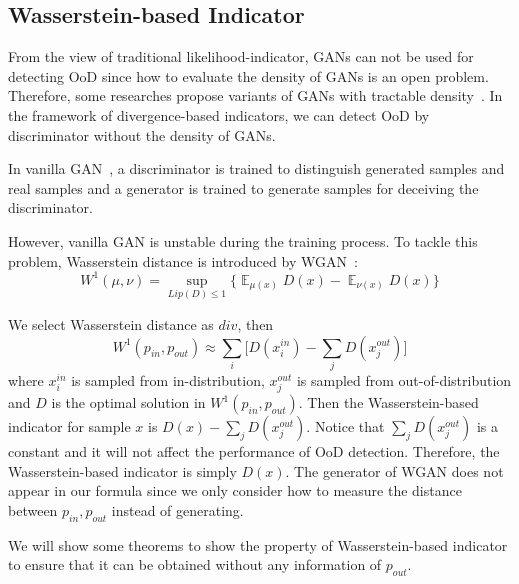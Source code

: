 \documentclass[letterpaper]{article} %
\newcommand{\E}{\operatorname{\mathbb{E}}}
\newcommand{\pin}{p_{in}}
\newcommand{\pout}{p_{out}}
\begin{document}
\subsection{Wasserstein-based Indicator}
From the view of traditional likelihood-indicator, GANs can not be used for detecting OoD since  how to evaluate the density of GANs is an open problem\cite{nalisnick2019do}. Therefore, some researches propose variants of GANs with tractable density~\cite{kumar2019maximum}. In the framework of divergence-based indicators, we can detect OoD by discriminator without the density of GANs.                                                                                                                                                                                                                                                                                                                                                                                                      

In vanilla GAN~\cite{goodfellow2014generative}, a discriminator is trained to distinguish generated samples and real samples and  a generator is trained to generate samples for deceiving the discriminator.

However, vanilla GAN is unstable during the training process. To tackle this problem, Wasserstein distance is introduced by WGAN~\cite{arjovsky2017wasserstein}:
\begin{equation}
	W^1(\mu, \nu) = \sup_{Lip(D) \leq 1} \{\E_{\mu(x)} D(x)  - \E_{\nu(x)} D(x)\}
\end{equation}

We select Wasserstein distance as $div$, then
\begin{equation}
	W^1(\pin, \pout) \approx \sum_i \Big[D(x_i^{in}) - \sum_j D(x_j^{out})\Big]
\end{equation} 
where $x_i^{in}$ is sampled from in-distribution, $x_j^{out}$ is sampled from out-of-distribution and $D$ is the optimal solution in $W^1(\pin, \pout)$. Then the Wasserstein-based indicator for sample $x$ is $D(x) - \sum_{j} D(x_j^{out})$. Notice that $\sum_{j} D(x_j^{out})$ is a constant and it will not affect the performance of OoD detection. Therefore, the Wasserstein-based indicator is simply $D(x)$. The generator of WGAN does not appear in our formula since we only consider how to measure the distance between $\pin, \pout$ instead of generating. 

We will show some theorems to show the property of Wasserstein-based indicator to ensure that it can be obtained without any information of $\pout$. 
\end{document}
